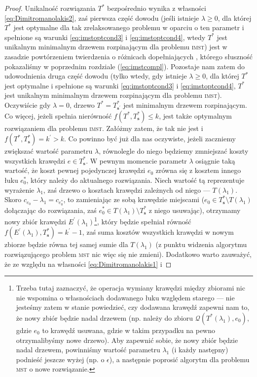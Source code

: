 \begin{proof}
	Unikalność rozwiązania $T^{\ast}$ bezpośrednio wynika z własności \ref{eq:Dimitromanolakis2}, zaś pierwsza część dowodu (jeśli istnieje $\lambda \geqslant 0$, dla której $T^{\ast}$ jest optymalne dla tak zrelaksowanego problemu w oparciu o ten parametr i spełnione są warunki \ref{eq:imstoptcond3} i \ref{eq:imstoptcond4}, wtedy $T^{\ast}$ jest unikalnym minimalnym drzewem rozpinającym dla problemu \textsc{imst}) jest w zasadzie powtórzeniem twierdzenia o różnicach dopełniających , którego słuszność pokazaliśmy w poprzednim rozdziale (\ref{eq:imstcompl}). Pozostaje nam zatem do udowodnienia druga część dowodu (tylko wtedy, gdy istnieje $\lambda \geqslant 0$, dla której $T^{\ast}$ jest optymalne i spełnione są warunki \ref{eq:imstoptcond3} i \ref{eq:imstoptcond4}, $T^{\ast}$ jest unikalnym minimalnym drzewem rozpinającym dla problemu \textsc{imst}). Oczywiście gdy $\lambda = 0$, drzewo $T^{\ast} = T^{\ast}_{\textbf{s}^{\prime}}$ jest minimalnym drzewem rozpinającym. Co więcej, jeżeli spełnia nierówność $f \left( T^{\ast}, T^{\ast}_{\textbf{s}} \right) \leqslant k$, jest także optymalnym rozwiązaniem dla problemu \textsc{imst}. Załóżmy zatem, że tak nie jest i $f \left( T^{\ast}, T^{\ast}_{\textbf{s}} \right) = k^{\prime} > k$. Co powinno być już dla nas oczywiste, jeżeli zaczniemy zwiększać wartość parametru $\lambda$, równolegle do niego będziemy zmniejszać koszty wszystkich krawędzi $e \in T^{\ast}_{\textbf{s}}$. W pewnym momencie parametr $\lambda$ osiągnie taką wartość, że koszt pewnej pojedynczej krawędzi $e_{0}$ zrówna się z kosztem innego łuku $e_{0}^{\ast}$, który należy do aktualnego rozwiązania. Niech wartość tą reprezentuje wyrażenie $\lambda_{1}$, zaś drzewo o kosztach krawędzi zależnych od niego --- $T \left( \lambda_{1} \right)$. Skoro $c_{e_{0}} - \lambda_{1} = c_{e_{0}^{\ast}}$, to zamieniając ze sobą krawędzie miejscami ($e_{0} \in T^{\ast}_{\textbf{s}} \setminus T \left( \lambda_{1} \right)$ dołączając do rozwiązania, zaś $e_{0}^{\ast} \in T \left( \lambda_{1} \right) \setminus T^{\ast}_{\textbf{s}}$ z niego usuwając), otrzymamy nowy zbiór krawędzi $E^{\prime} \left( \lambda_{1} \right)$\footnote{Trzeba tutaj zaznaczyć, że operacja wymiany krawędzi między zbiorami nic nie wspomina o własnościach dodawanego łuku względem starego --- nie jesteśmy zatem w stanie powiedzieć, czy dodawana krawędź zapewni nam to, że nowy zbiór będzie nadal drzewem (np. należy do zbioru $\mathcal{Q} \left( T^{\ast} \left( \lambda_{1} \right), e_{0} \right)$, gdzie $e_{0}$ to krawędź usuwana, gdzie w takim przypadku na pewno otrzymalibyśmy nowe drzewo). Aby zapewnić sobie, że nowy zbiór będzie nadal drzewem, powinniśmy wartość parametru $\lambda_{1}$ (i każdy następny) podnieść jeszcze wyżej (np. o $\epsilon$), a następnie poprosić algorytm dla problemu \textsc{mst} o nowe rozwiązanie.}, który będzie spełniał równość $f \left( E^{\prime} \left( \lambda_{1} \right), T^{\ast}_{\textbf{s}} \right) = k^{\prime} - 1$, zaś suma kosztów wszystkich krawędzi w nowym zbiorze będzie równa tej samej sumie dla $T \left( \lambda_{1} \right)$ (z punktu widzenia algorytmu rozwiązującego problem \textsc{mst} nic więc się nie zmieni). Dodatkowo warto zauważyć, że ze względu na własności \ref{eq:Dimitromanolakis1} i 
\end{proof}
